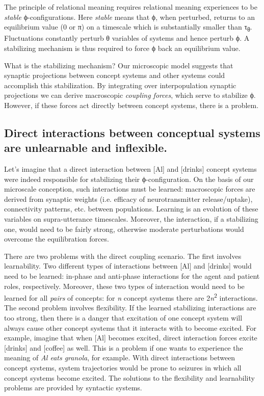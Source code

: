   The principle of relational meaning requires relational meaning experiences to be \textit{stable} ϕ-configurations. Here \textit{stable} means that ϕ, when perturbed, returns to an equilibrium value (0 or π) on a timescale which is substantially smaller than τ\textsubscript{θ}. Fluctuations constantly perturb θ variables of systems and hence perturb ϕ. A stabilizing mechanism is thus required to force ϕ back an equilibrium value. 

  What is the stabilizing mechanism? Our microscopic model suggests that synaptic projections between concept systems and other systems could accomplish this stabilization. By integrating over interpopulation synaptic projections we can derive macroscopic \textit{coupling forces}, which serve to stabilize ϕ. However, if these forces act directly between concept systems, there is a problem.

\subsection{Direct interactions between conceptual systems are unlearnable and inflexible.} 

Let's imagine that a direct interaction between [Al] and [drinks] concept systems were indeed responsible for stabilizing their ϕ-configuration. On the basis of our microscale conception, such interactions must be learned: macroscopic forces are derived from synaptic weights (i.e. efficacy of neurotransmitter release/uptake), connectivity patterns, etc. between populations. Learning is an evolution of these variables on supra-utterance timescales. Moreover, the interaction, if a stabilizing one, would need to be fairly strong, otherwise moderate perturbations would overcome the equilibration forces. 

  There are two problems with the direct coupling scenario. The first involves learnability. Two different types of interactions between [Al] and [drinks] would need to be learned: in-phase and anti-phase interactions for the agent and patient roles, respectively. Moreover, these two types of interaction would need to be learned for all \textit{pairs} of concepts: for \textit{n} concept systems there are 2\textit{n}\textsuperscript{2} interactions. The second problem involves flexibility. If the learned stabilizing interactions are too strong, then there is a danger that excitation of one concept system will always cause other concept systems that it interacts with to become excited. For example, imagine that when [Al] becomes excited, direct interaction forces excite [drinks] and [coffee] as well. This is a problem if one wants to experience the meaning of \textit{Al eats granola}, for example. With direct interactions between concept systems, system trajectories would be prone to seizures in which all concept systems become excited. The solutions to the flexibility and learnability problems are provided by syntactic systems.

